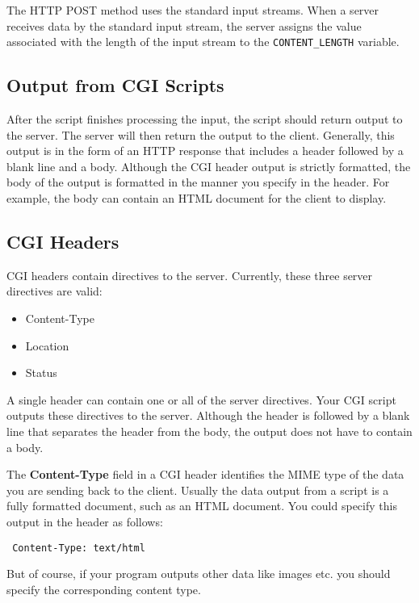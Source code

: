 The HTTP POST method uses the standard input streams. When a server
receives data by the standard input stream, the server assigns the value
associated with the length of the input stream to the \verb|CONTENT_LENGTH|
variable.

\subsection{Output from CGI Scripts}

After the script finishes processing the input, the script should return
output to the server. The server will then return the output to the
client. Generally, this output is in the form of an HTTP response that
includes a header followed by a blank line and a body. Although the CGI
header output is strictly formatted, the body of the output is formatted
in the manner you specify in the header. For example, the body can contain
an HTML document for the client to display.

\subsection{CGI Headers}

CGI headers contain directives to the server. Currently, these three
server directives are valid:
\begin{itemize}
\item Content-Type
\item Location
\item Status
\end{itemize}

A single header can contain one or all of the server directives. Your CGI
script outputs these directives to the server. Although the header is
followed by a blank line that separates the header from the body, the
output does not have to contain a body.

The {\bf Content-Type} field in a CGI header identifies the MIME type of the
data you are sending back to the client. Usually the data output from a script
is a fully formatted document, such as an HTML document. You could specify this
output in the header as follows:


\begin{verbatim}
 Content-Type: text/html
\end{verbatim}


But of course, if your program outputs other data like images etc. you should 
specify the corresponding content type. 

